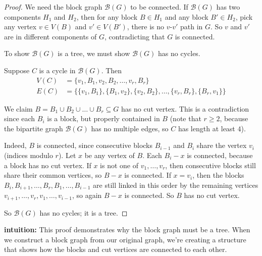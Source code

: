 \documentclass{article}
\theoremstyle{definition}
\begin{document}
\begin{proof}
We need the block graph $\mathcal{B}(G)$ to be connected. If $\mathcal{B}(G)$ has two components $H_1$ and $H_2$, then for any block $B \in H_1$ and any block $B' \in H_2$, pick any vertex $v \in V(B)$ and $v' \in V(B')$, there is no $v$-$v'$ path in $G$. So $v$ and $v'$ are in different components of $G$, contradicting that $G$ is connected.

To show $\mathcal{B}(G)$ is a tree, we must show $\mathcal{B}(G)$ has no cycles.

Suppose $C$ is a cycle in $\mathcal{B}(G)$. Then
\begin{align*}
V(C) &= \{v_1, B_1, v_2, B_2, \ldots, v_r, B_r\} \\
E(C) &= \{\{v_1, B_1\}, \{B_1, v_2\}, \{v_2, B_2\}, \ldots, \{v_r, B_r\}, \{B_r, v_1\}\}
\end{align*}

We claim $B = B_1 \cup B_2 \cup \ldots \cup B_r \subseteq G$ has no cut vertex. This is a contradiction since each $B_i$ is a block, but properly contained in $B$ (note that $r \geq 2$, because the bipartite graph $\mathcal{B}(G)$ has no multiple edges, so $C$ has length at least $4$).

Indeed, $B$ is connected, since consecutive blocks $B_{i-1}$ and $B_i$ share the vertex $v_i$ (indices modulo $r$). Let $x$ be any vertex of $B$. Each $B_i - x$ is connected, because a block has no cut vertex. If $x$ is not one of $v_1, \ldots, v_r$, then consecutive blocks still share their common vertices, so $B - x$ is connected. If $x = v_i$, then the blocks $B_i, B_{i+1}, \ldots, B_r, B_1, \ldots, B_{i-1}$ are still linked in this order by the remaining vertices $v_{i+1}, \ldots, v_r, v_1, \ldots, v_{i-1}$, so again $B - x$ is connected. So $B$ has no cut vertex.

So $\mathcal{B}(G)$ has no cycles; it is a tree.
\end{proof}

\medskip
\noindent\textbf{intuition:} This proof demonstrates why the block graph must be a tree. When we construct a block graph from our original graph, we're creating a structure that shows how the blocks and cut vertices are connected to each other.
\end{document}

